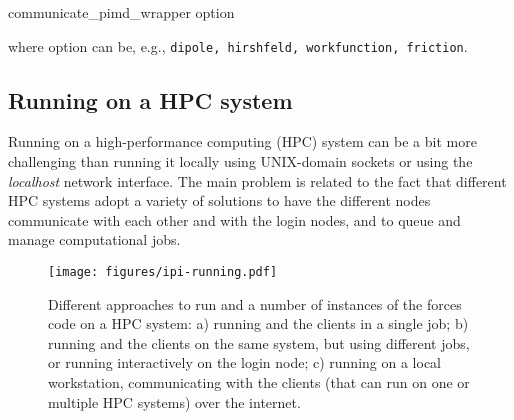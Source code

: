 \documentclass[11pt,english,fleqn]{report}
\newenvironment{code}{%
\footnotesize 
\verbatim
}{
\endverbatim
\normalsize
}
\begin{document}
\begin{code}
communicate_pimd_wrapper option
\end{code}
where option can be, e.g., {\small {\tt dipole, hirshfeld, workfunction, friction}}.

\subsection{Running on a HPC system}\label{hpc}

Running \ipi on a high-performance computing (HPC) system can be a bit more challenging
than running it locally using UNIX-domain sockets or using the \emph{localhost} 
network interface.
The main problem is related to the fact that different HPC systems adopt
a variety of solutions to have the different nodes communicate with each other
and with the login nodes, and to queue and manage computational jobs. 
 
\begin{figure}[hbt]
\centering\texttt{[image: figures/ipi-running.pdf]}
\caption{\label{fig:running} Different approaches to run \ipi and a number of 
instances of the forces code on a HPC system: a) running \ipi and the clients in a single
job; b) running \ipi and the clients on the same system, but using different jobs, or running
\ipi interactively on the login node; c) running \ipi on a local workstation, communicating
with the clients (that can run on one or multiple HPC systems) over the internet. } 
\end{figure}
\end{document}
